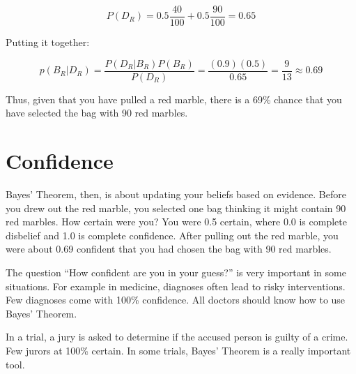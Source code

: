 $$P(D_R) = 0.5 \frac{40}{100} + 0.5 \frac{90}{100} = 0.65$$

Putting it together:

$$p(B_R | D_R) = \frac{ P(D_R | B_R) P(B_R) } {P(D_R)} = \frac{(0.9)(0.5)}{0.65} = \frac{9}{13} \approx 0.69$$

Thus, given that you have pulled a red marble, there is a 69\% chance
that you have selected the bag with 90 red marbles.

\section{Confidence}

Bayes' Theorem, then, is about updating your beliefs based on
evidence.  Before you drew out the red marble, you selected one bag
thinking it might contain 90 red marbles. How certain were you? You
were 0.5 certain, where 0.0 is complete disbelief and 1.0 is complete
confidence.  After pulling out the red marble, you were about 0.69
confident that you had chosen the bag with 90 red marbles.

The question ``How confident are you in your guess?'' is very
important in some situations. For example in medicine, diagnoses often
lead to risky interventions. Few diagnoses come with 100\% confidence.
All doctors should know how to use Bayes' Theorem.

In a trial, a jury is asked to determine if the accused person is
guilty of a crime. Few jurors at 100\% certain. In some trials, Bayes'
Theorem is a really important tool.

